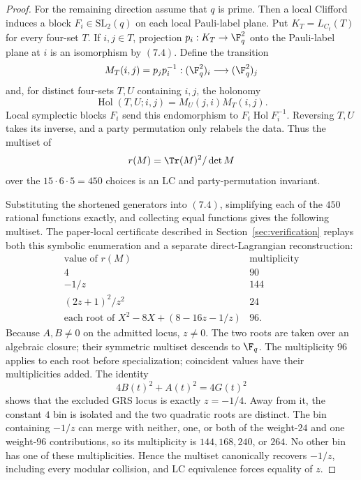\begin{proof}
For the remaining direction assume that \(q\) is prime.  Then a local
Clifford induces a block \(F_i\in\mathrm{SL}_2(q)\) on each local
Pauli-label plane.  Put \(K_T=L_{C_t}(T)\) for every four-set
\(T\).  If \(i,j\in T\), projection
\(p_i:K_T\to\F_q^2\) onto the Pauli-label plane at \(i\) is an
isomorphism by \((7.4)\).  Define the transition
\[
 M_T(i,j)=p_jp_i^{-1}:(\F_q^2)_i\longrightarrow(\F_q^2)_j
\]
and, for distinct four-sets \(T,U\) containing \(i,j\), the holonomy
\[
 \operatorname{Hol}(T,U;i,j)=M_U(j,i)M_T(i,j).          \tag{7.4}
\]
Local symplectic blocks \(F_i\) send this endomorphism to
\(F_i\operatorname{Hol}F_i^{-1}\).  Reversing \(T,U\) takes its inverse,
and a party permutation only relabels the data.  Thus the multiset of
\[
 r(M)=\Tr(M)^2/\det M
\]
over the \(15\cdot6\cdot5=450\) choices is an LC and party-permutation
invariant.

Substituting the shortened generators into \((7.4)\), simplifying each
of the \(450\) rational functions exactly, and collecting equal functions
gives the following multiset.  The paper-local certificate described in
Section~\ref{sec:verification} replays both this symbolic enumeration and
a separate direct-Lagrangian reconstruction:
\[
\begin{array}{c|c}
\text{value of \(r(M)\)}&\text{multiplicity}\\
\hline
4&90\\
-1/z&144\\
(2z+1)^2/z^2&24\\
\text{each root of }X^2-8X+(8-16z-1/z)&96.
\end{array}                                             \tag{7.5}
\]
Because \(A,B\ne0\) on the admitted locus, \(z\ne0\).
The two roots are taken over an algebraic closure; their symmetric
multiset descends to \(\F_q\).  The multiplicity \(96\) applies to each
root before specialization;
coincident values have their multiplicities added.  The identity
\[
 4B(t)^2+A(t)^2=4G(t)^2
\]
shows that the excluded GRS locus is exactly \(z=-1/4\).  Away from it,
the constant \(4\) bin is isolated and the two quadratic roots are
distinct.  The bin containing \(-1/z\) can merge with neither, one, or
both of the weight-\(24\) and one weight-\(96\) contributions, so its
multiplicity is \(144,168,240\), or \(264\).  No other bin has one of
these multiplicities.  Hence the multiset canonically recovers
\(-1/z\), including every modular collision, and LC equivalence forces
equality of \(z\).
\end{proof}


